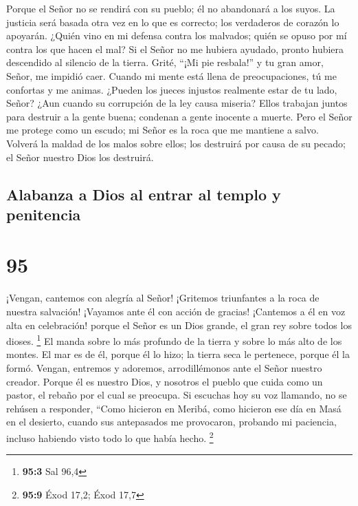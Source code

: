  Porque el Señor no se rendirá con su pueblo; él no
abandonará a los suyos.  La justicia será basada otra vez
en lo que es correcto; los verdaderos de corazón lo apoyarán.
 ¿Quién vino en mi defensa contra los malvados; quién se
opuso por mí contra los que hacen el mal?  Si el Señor no
me hubiera ayudado, pronto hubiera descendido al silencio de la tierra.
 Grité, ``¡Mi pie resbala!'' y tu gran amor, Señor, me
impidió caer.  Cuando mi mente está llena de
preocupaciones, tú me confortas y me animas.  ¿Pueden los
jueces injustos realmente estar de tu lado, Señor? ¿Aun cuando su
corrupción de la ley causa miseria?  Ellos trabajan juntos
para destruir a la gente buena; condenan a gente inocente a muerte.
 Pero el Señor me protege como un escudo; mi Señor es la
roca que me mantiene a salvo.  Volverá la maldad de los
malos sobre ellos; los destruirá por causa de su pecado; el Señor
nuestro Dios los destruirá.

\hypertarget{alabanza-a-dios-al-entrar-al-templo-y-penitencia}{%
\subsection{Alabanza a Dios al entrar al templo y
penitencia}\label{alabanza-a-dios-al-entrar-al-templo-y-penitencia}}

\hypertarget{section-94}{%
\section{95}\label{section-94}}

 ¡Vengan, cantemos con alegría al Señor! ¡Gritemos
triunfantes a la roca de nuestra salvación!  ¡Vayamos ante
él con acción de gracias! ¡Cantemos a él en voz alta en celebración!
 porque el Señor es un Dios grande, el gran rey sobre todos
los dioses. \footnote{\textbf{95:3} Sal 96,4}  El manda
sobre lo más profundo de la tierra y sobre lo más alto de los montes.
 El mar es de él, porque él lo hizo; la tierra seca le
pertenece, porque él la formó.  Vengan, entremos y adoremos,
arrodillémonos ante el Señor nuestro creador.  Porque él es
nuestro Dios, y nosotros el pueblo que cuida como un pastor, el rebaño
por el cual se preocupa. Si escuchas hoy su voz llamando, 
no se rehúsen a responder, ``Como hicieron en Meribá, como hicieron ese
día en Masá en el desierto,  cuando sus antepasados me
provocaron, probando mi paciencia, incluso habiendo visto todo lo que
había hecho. \footnote{\textbf{95:9} Éxod 17,2; Éxod 17,7}


